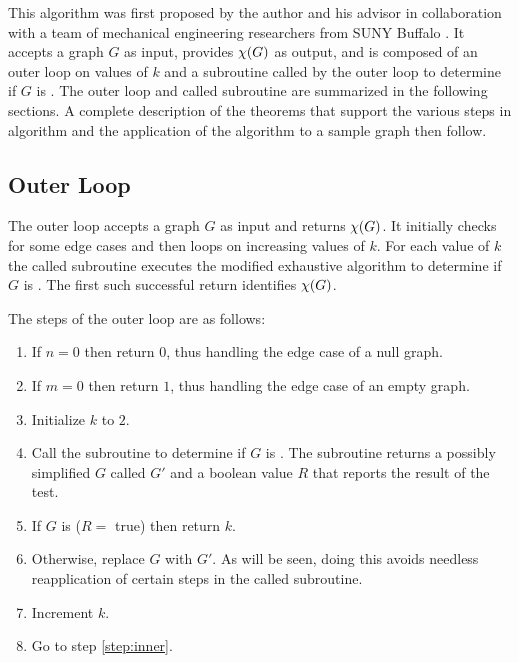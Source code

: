 This algorithm was first proposed by the author and his advisor in collaboration with a team of mechanical
engineering researchers from SUNY Buffalo \cite{cavallaro}.  It accepts a graph \(G\) as input, provides \(\chi(G)\)
as output, and is composed of an outer loop on values of \(k\) and a subroutine called by the outer loop to
determine if \(G\) is .  The outer loop and called subroutine are summarized in the following
sections.  A complete description of the theorems that support the various steps in algorithm and the application
of the algorithm to a sample graph then follow.

\subsection{Outer Loop}

The outer loop accepts a graph \(G\) as input and returns \(\chi(G)\).  It initially checks for some edge cases and
then loops on increasing values of \(k\).  For each value of \(k\) the called subroutine executes the modified
exhaustive algorithm to determine if \(G\) is .  The first such successful return identifies
\(\chi(G)\).

The steps of the outer loop are as follows:

\begin{enumerate}
\item \label{step:null} If \(n=0\) then return \(0\), thus handling the edge case of a null graph.

\item \label{step:one} If \(m=0\) then return \(1\), thus handling the edge case of an empty graph.

\item \label{step:init} Initialize \(k\) to \(2\).

\item \label{step:inner} Call the subroutine to determine if \(G\) is .  The subroutine returns a
  possibly simplified \(G\) called \(G'\) and a boolean value \(R\) that reports the result of the test.

\item \label{step:call} If \(G\) is  (\(R=\) true) then return \(k\).

\item \label{step:newg} Otherwise, replace \(G\) with \(G'\).  As will be seen, doing this avoids needless
  reapplication of certain steps in the called subroutine.

\item \label{step:incr} Increment \(k\).

\item \label{step:loop} Go to step \ref{step:inner}.
\end{enumerate}

